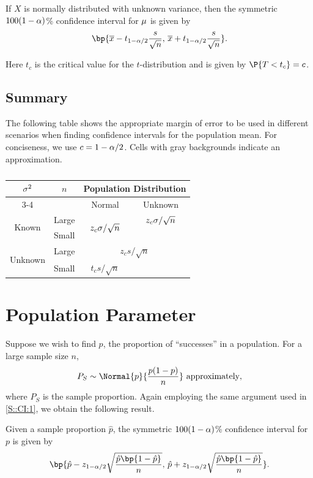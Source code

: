 \begin{proposition}
    If $X$ is normally distributed with unknown variance, then the symmetric $100(1-\alpha)$\% confidence interval for $\mu$ is given by \[\bp{\ol{x} - t_{1 - \a/2} \frac{s}{\sqrt{n}}, \, \ol{x} + t_{1 - \a/2} \frac{s}{\sqrt{n}}}.\]
\end{proposition}

Here $t_c$ is the critical value for the $t$-distribution and is given by $\P{T < t_c} = c$.

\subsection{Summary}

The following table shows the appropriate margin of error to be used in different scenarios when finding confidence intervals for the population mean. For conciseness, we use $c = 1 - \alpha/2$. Cells with gray backgrounds indicate an approximation.

\begin{table}[H]
    \centering
    \bgroup
    \def\arraystretch{1.2}
    \begin{tabular}{|c|c|cc|}
    \hline
    \multirow{2}{*}{$\sigma^2$} & \multirow{2}{*}{$n$} & \multicolumn{2}{c|}{Population Distribution} \\ \cline{3-4} 
    &  & \multicolumn{1}{c|}{Normal} & Unknown \\ \hline
    \multirow{2}{*}{Known} & Large & \multicolumn{1}{c|}{\multirow{2}{*}{$z_c \sigma/\sqrt{n}$}} & \cellcolor{black!20} $z_c \sigma/\sqrt{n}$ \\ \cline{2-2} \cline{4-4} 
    & Small & \multicolumn{1}{c|}{} & \cellcolor{black} \\ \hline
    \multirow{2}{*}{Unknown} & Large & \multicolumn{2}{c|}{\cellcolor{black!20} $z_c s/\sqrt{n}$} \\ \cline{2-4} 
    & Small & \multicolumn{1}{c|}{$t_c s/\sqrt{n}$} & \cellcolor{black} \\ \hline
    \end{tabular}
    \egroup
    \caption{}
\end{table}

\section{Population Parameter}

Suppose we wish to find $p$, the proportion of ``successes'' in a population. For a large sample size $n$, \[P_S \sim \Normal{p}{\frac{p(1-p)}{n}} \text{ approximately},\] where $P_S$ is the sample proportion. Again employing the same argument used in \SS\ref{S::CI:1}, we obtain the following result.

\begin{proposition}
    Given a sample proportion $\hat{p}$, the symmetric $100(1-\alpha)$\% confidence interval for $p$ is given by \[\bp{\hat{p} - z_{1 - \a/2} \sqrt{\frac{\hat{p}\bp{1 - \hat{p}}}{n}}, \, \hat{p} + z_{1 - \a/2} \sqrt{\frac{\hat{p}\bp{1 - \hat{p}}}{n}}}.\]
\end{proposition}